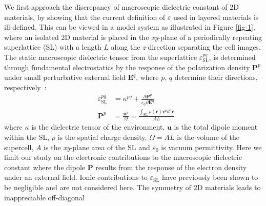 \documentclass[journal=ancac3,manuscript=article,email=true,hyperref=true,keywords=false]{achemso}
\begin{document}
We first approach the discrepancy of macroscopic dielectric constant
of 2D materials, by showing that the current definition of
$\varepsilon$ used in layered materials is {ill-defined}.  This can be
viewed in a model system as illustrated
in Figure \ref{fig-1}, where an isolated 2D material is placed in
the \textit{xy}-plane of a periodically repeating superlattice (SL)
with a length $L$ along the \textit{z}-direction separating the cell
images. The static macroscopic dielectric tensor from the superlattice
$\varepsilon_{\mathrm{SL}}^{pq}$, is determined through fundamental
electrostatics by the response of the polarization density
$\boldsymbol{P}^{p}$ under small perturbative external field
$\boldsymbol{E}^{q}$, where $p$, $q$ determine their directions,
respectively~\cite{Dressel_2001_electrodynamics}:
\begin{subequations}
  \begin{eqnarray}
      \label{eq:def-eps-1}
    &\varepsilon_{\mathrm{SL}}^{pq} &= \kappa^{pq} +
                                 {\displaystyle \frac{\partial \boldsymbol{P}^{p}}{\varepsilon_{0} \partial \boldsymbol{E}^{q}}} \\
          \label{eq:def-eps-2}
    &\boldsymbol{P}^{p} &=  {\displaystyle \frac{\boldsymbol{u}^{p}}{\Omega}}
                          = {\displaystyle \frac{{\displaystyle
          \int_{\mathrm{SL}} \rho(\boldsymbol{r}) \boldsymbol{r}^{p} d^{3}\boldsymbol{r}}}{AL}}
  \end{eqnarray}
\end{subequations}
where $\kappa$ is the dielectric tensor of the environment,
$\boldsymbol{u}$ is the total dipole moment within the SL, $\rho$ is
the spatial charge density, $\Omega=AL$ is the volume of the
supercell, $A$ is the \textit{xy}-plane area of the SL and
$\varepsilon_{0}$ is vacuum permittivity. Here we limit our study on
the electronic contributions to the macroscopic dielectric constant
where the dipole $\boldsymbol{P}$ results from the response 
of the electron density under an external field.  
Ionic contributions\cite{Sohier_2017} to $\varepsilon_{\mathrm{SL}}$ 
have previously been shown to be negligible\cite{relax-epsilon} and 
are not considered here.  
%
The symmetry of 2D materials leads to inappreciable off-diagonal
\end{document}
